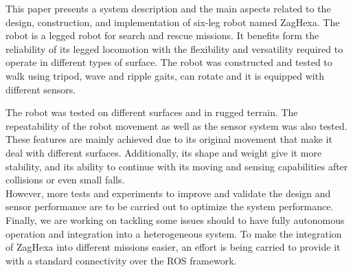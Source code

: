 This paper presents a system description and the main aspects related to the design, construction, and implementation of six-leg robot named ZagHexa. The robot is a legged robot for search and rescue missions. It benefits form the reliability of its legged locomotion with the flexibility and versatility required to operate in different types of surface. The robot was constructed and tested to walk using tripod, wave and ripple gaits, can rotate and it is equipped with different sensors.

The robot was tested on different surfaces and in rugged terrain. The repeatability of the robot movement as well as the sensor system was also tested.	 These features are mainly achieved due to its original movement that make it deal with different surfaces. Additionally, its shape and weight give it more stability, and its ability to continue with its moving and sensing capabilities after collisions or even small falls. \\ 
However, more tests and experiments to improve and validate the design and sensor performance are to be carried out to optimize the system performance.
Finally, we are working on tackling some issues should to have fully autonomous operation and integration into a heterogeneous system. To make the integration of ZagHexa into different missions easier, an effort is being carried to provide it with a standard connectivity over the ROS framework.